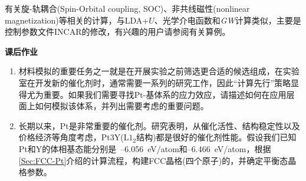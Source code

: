 {{有关旋-轨耦合(\textrm{Spin-Orbital coupling, SOC})、非共线磁性(\textrm{nonlinear magnetization})等相关的计算，与\textrm{LDA}+$U$、光学介电函数和\textit{GW}计算类似，主要是控制参数文件\textrm{INCAR}的修改，有兴趣的用户请参阅有关算例。

\clearpage\newpage
\textbf{课后作业}
\begin{enumerate}
	\item 材料模拟的重要任务之一就是在开展实验之前筛选更合适的候选组成，在实验室在开发新的催化剂时，通常需要一系列的研究工作，因此“计算先行”策略显得尤为重要。如果我们需要寻找\textrm{Pt}-基体系的应力效应，请描述如何在应用层面上如何模拟该体系，并列出需要考虑的重要问题。
	\item 长期以来，\textrm{Pt}是非常重要的催化剂。研究表明，从催化活性、结构稳定性以及价格经济等角度考虑，\textrm{Pt3Y}($\mathrm{L1}_2$结构)都是很好的催化剂性能。假设我们已知\textrm{Pt}和\textrm{Y}的体相基态能分别是~--6.056\textrm{~eV/atom}和\textrm{--6.466}\textrm{~eV/atom}，根据\ref{Sec:FCC-Pt}介绍的计算流程，构建\textrm{FCC}晶格(四个原子)的，并确定平衡态晶格参数。

\end{enumerate}}}
